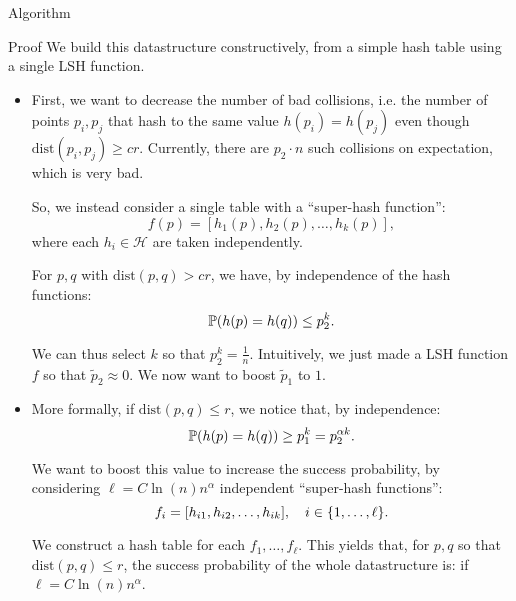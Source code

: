 \documentclass[a4paper]{article}
\begin{document}
\begin{parag}{Algorithm}
    \begin{subparag}{Proof}
        We build this datastructure constructively, from a simple hash table using a single LSH function.

        \begin{itemize}[left=0pt]
            \item First, we want to decrease the number of bad collisions, i.e. the number of points $p_i, p_j$ that hash to the same value $h\left(p_i\right) = h\left(p_j\right)$ even though $\text{dist}\left(p_i, p_j\right) \geq cr$. Currently, there are $p_2\cdot n$ such collisions on expectation, which is very bad. 

            So, we instead consider a single table with a ``super-hash function'': 
            \[f\left(p\right) = \left[h_1\left(p\right), h_2\left(p\right), \ldots, h_k\left(p\right)\right],\]
            where each $h_i \in \mathcal{H}$ are taken independently.

            For $p, q$ with $\text{dist}\left(p, q\right) > cr$, we have, by independence of the hash functions: 
            \[\prob\left(h\left(p\right) = h\left(q\right)\right) \leq p_2^k.\]
           
            We can thus select $k$ so that $p_2^k = \frac{1}{n}$. Intuitively, we just made a LSH function $f$ so that $\widetilde{p}_2 \approx 0$. We now want to boost $\widetilde{p}_1$ to $1$.
            
            \item More formally, if $\text{dist}\left(p, q\right) \leq r$, we notice that, by independence:
            \[\prob\left(h\left(p\right) = h\left(q\right)\right) \geq p_1^k = p_2^{\alpha k}.\]

            We want to boost this value to increase the success probability, by considering $\ell = C \ln\left(n\right)n^{\alpha} $ independent ``super-hash functions'': 
            \[f_i = \left[h_{i1}, h_{i2}, \ldots, h_{ik}\right], \mathspace i \in \left\{1, \ldots, \ell\right\}.\]

            We construct a hash table for each $f_1, \ldots, f_{\ell}$. This yields that, for $p, q$ so that $\text{dist}\left(p, q\right) \leq r$, the success probability of the whole datastructure is: 
            if $\ell = C \ln\left(n\right) n^{\alpha}$.
        \end{itemize}


\end{subparag}
\end{parag}
\end{document}
